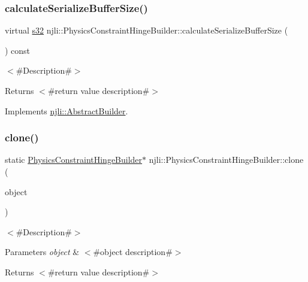 \subsubsection{\texorpdfstring{calculate\+Serialize\+Buffer\+Size()}{calculateSerializeBufferSize()}}
{\footnotesize\ttfamily virtual \mbox{\hyperlink{_util_8h_aa62c75d314a0d1f37f79c4b73b2292e2}{s32}} njli\+::\+Physics\+Constraint\+Hinge\+Builder\+::calculate\+Serialize\+Buffer\+Size (\begin{DoxyParamCaption}{ }\end{DoxyParamCaption}) const\hspace{0.3cm}{\ttfamily [virtual]}}

$<$\#\+Description\#$>$

\begin{DoxyReturn}{Returns}
$<$\#return value description\#$>$ 
\end{DoxyReturn}


Implements \mbox{\hyperlink{classnjli_1_1_abstract_builder_aa1d220053e182c37b31b427499c6eacf}{njli\+::\+Abstract\+Builder}}.

\mbox{\label{classnjli_1_1_physics_constraint_hinge_builder_ac81051c05d79b7ee3bbd48c54dbdec63}} 
\subsubsection{\texorpdfstring{clone()}{clone()}}
{\footnotesize\ttfamily static \mbox{\hyperlink{classnjli_1_1_physics_constraint_hinge_builder}{Physics\+Constraint\+Hinge\+Builder}}$\ast$ njli\+::\+Physics\+Constraint\+Hinge\+Builder\+::clone (\begin{DoxyParamCaption}\item[{const \mbox{\hyperlink{classnjli_1_1_physics_constraint_hinge_builder}{Physics\+Constraint\+Hinge\+Builder}} \&}]{object }\end{DoxyParamCaption})\hspace{0.3cm}{\ttfamily [static]}}

$<$\#\+Description\#$>$


\begin{DoxyParams}{Parameters}
{\em object} & $<$\#object description\#$>$\\
\hline
\end{DoxyParams}
\begin{DoxyReturn}{Returns}
$<$\#return value description\#$>$ 
\end{DoxyReturn}
\mbox{\label{classnjli_1_1_physics_constraint_hinge_builder_a6f6f4723d03bed6ed1b36345465aa139}} 
